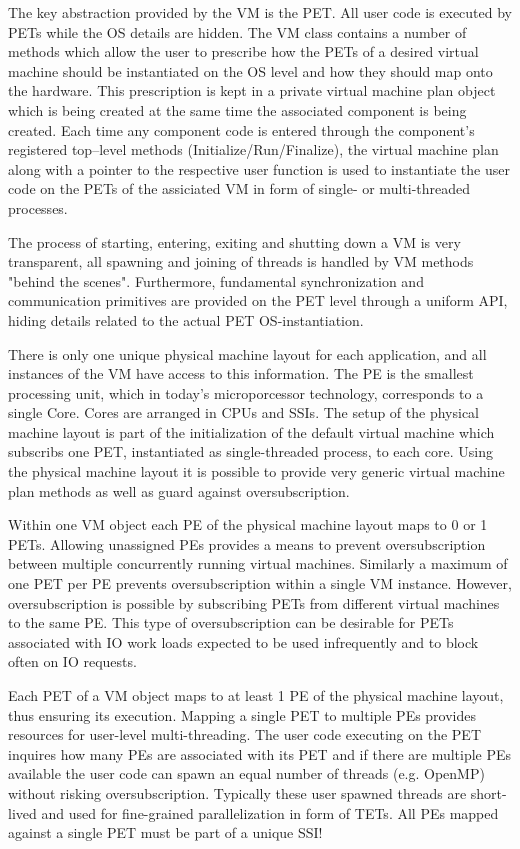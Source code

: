 The key abstraction provided by the VM is the PET. All user code is executed by PETs while the OS details are hidden. The VM class contains a number of methods which allow the user to prescribe how the PETs of a desired virtual machine should be instantiated on the OS level and how they should map onto the hardware. This prescription is kept in a private virtual machine plan object which is being created at the same time the associated component is being created. Each time any component code is entered through the component's registered top--level methods (Initialize/Run/Finalize), the virtual machine plan along with a pointer to the respective user function is used to instantiate the user code on the PETs of the assiciated VM in form of single- or multi-threaded processes. 

The process of starting, entering, exiting and shutting down a VM is very transparent, all spawning and joining of threads is handled by VM methods "behind the scenes". Furthermore, fundamental synchronization and communication primitives are provided on the PET level through a uniform API, hiding details related to the actual PET OS-instantiation.

There is only one unique physical machine layout for each application, and all instances of the VM have access to this information. The PE is the smallest processing unit, which in today's microporcessor technology, corresponds to a single Core. Cores are arranged in CPUs and SSIs. The setup of the physical machine layout is part of the initialization of the default virtual machine which subscribs one PET, instantiated as single-threaded process, to each core. Using the physical machine layout it is possible to provide very generic virtual machine plan methods as well as guard against oversubscription.

Within one VM object each PE of the physical machine layout maps to 0 or 1 PETs. Allowing unassigned PEs provides a means to prevent oversubscription between multiple concurrently running virtual machines. Similarly a maximum of one PET per PE prevents oversubscription within a single VM instance. However, oversubscription is possible by subscribing PETs from different virtual machines to the same PE. This type of oversubscription can be desirable for PETs associated with IO work loads expected to be used infrequently and to block often on IO requests.

Each PET of a VM object maps to at least 1 PE of the physical machine layout, thus ensuring its execution. Mapping a single PET to multiple PEs provides resources for user-level multi-threading. The user code executing on the PET inquires how many PEs are associated with its PET and if there are multiple PEs available the user code can spawn an equal number of threads (e.g. OpenMP) without risking oversubscription. Typically these user spawned threads are short-lived and used for fine-grained parallelization in form of TETs. All PEs mapped against a single PET must be part of a unique SSI!

